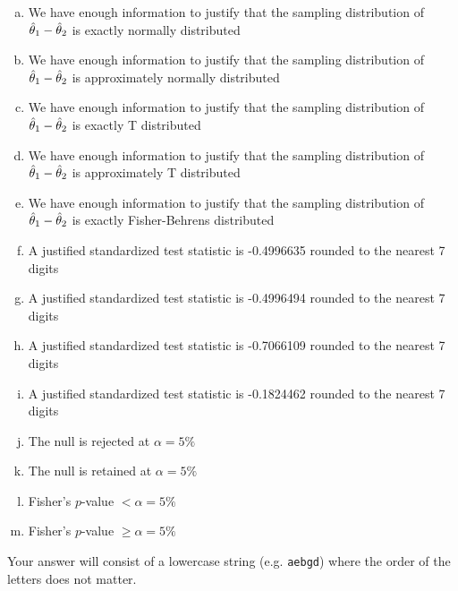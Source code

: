 \documentclass[12pt,landscape]{article}
\newcommand{\instr}{\small Your answer will consist of a lowercase string (e.g. \texttt{aebgd}) where the order of the letters does not matter. \normalsize}
\begin{document}
\begin{enumerate}[(a)]
\item We have enough information to justify that the sampling distribution of $\hat{\theta}_1 - \hat{\theta}_2$ is exactly normally distributed
\item We have enough information to justify that the sampling distribution of $\hat{\theta}_1 - \hat{\theta}_2$ is approximately normally distributed
\item We have enough information to justify that the sampling distribution of $\hat{\theta}_1 - \hat{\theta}_2$ is exactly T distributed
\item We have enough information to justify that the sampling distribution of $\hat{\theta}_1 - \hat{\theta}_2$ is approximately T distributed
\item We have enough information to justify that the sampling distribution of $\hat{\theta}_1 - \hat{\theta}_2$ is exactly Fisher-Behrens distributed

\item A justified standardized test statistic is -0.4996635 rounded to the nearest 7 digits
\item A justified standardized test statistic is -0.4996494 rounded to the nearest 7 digits %
\item A justified standardized test statistic is -0.7066109 rounded to the nearest 7 digits
\item A justified standardized test statistic is -0.1824462 rounded to the nearest 7 digits

\item The null is rejected at $\alpha = 5\%$
\item The null is retained at $\alpha = 5\%$

\item Fisher's $p$-value $ < \alpha = 5\%$
\item Fisher's $p$-value $ \geq \alpha = 5\%$
\end{enumerate}
\eenum\instr\pagebreak
\end{document}
